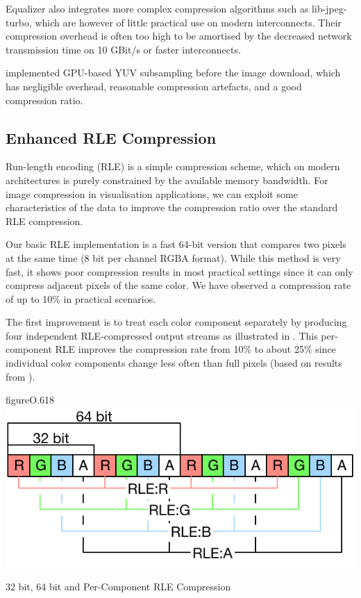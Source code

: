Equalizer also integrates more complex compression algorithms such as
\textsf{lib-jpeg-turbo}, which are however of little practical use on modern
interconnects. Their compression overhead is often too high to be amortised by
the decreased network transmission time on 10 GBit/s or faster interconnects.

\cite{MEP:10} implemented GPU-based YUV subsampling before the image download,
which has negligible overhead, reasonable compression artefacts, and a good
compression ratio.

\subsection{Enhanced RLE Compression}

Run-length encoding (RLE) is a simple compression scheme, which on modern
architectures is purely constrained by the available memory bandwidth. For image
compression in visualisation applications, we can exploit some characteristics
of the data to improve the compression ratio over the standard RLE compression.

Our basic RLE implementation is a fast 64-bit version that compares two pixels
at the same time (8 bit per channel RGBA format). While this method is very
fast, it shows poor compression results in most practical settings since it can
only compress adjacent pixels of the same color. We have observed a compression
rate of up to 10\% in practical scenarios.

The first improvement is to treat each color component separately by producing
four independent RLE-compressed output streams as illustrated in .
This per-component RLE improves the compression rate from 10\% to about 25\%
since individual color components change less often than full pixels (based on
results from \cite{MEP:10}).

\begin{wrapfloat}{figure}{O}{.618\textwidth}
  \includegraphics[width=.618\textwidth]{images/RLE}
  \caption{32 bit, 64 bit and Per-Component RLE Compression}
  \label{fRLE}
\end{wrapfloat}

